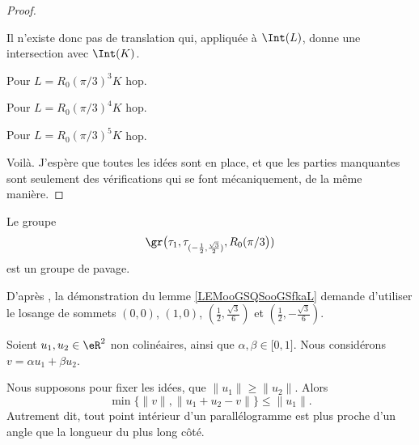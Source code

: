 \begin{proof}
\begin{subproof}
		Il n'existe donc pas de translation qui, appliquée à \( \Int(L)\), donne une intersection avec \( \Int(K)\).

		\item[Pour \( L=R_0(\pi/3)^3K\)]
		hop.
		\item[Pour \( L=R_0(\pi/3)^4K\)]
		hop.
		\item[Pour \( L=R_0(\pi/3)^5K\)]
		hop.
	\end{subproof}
	Voilà. J'espère que toutes les idées sont en place, et que les parties manquantes sont seulement des vérifications qui se font mécaniquement, de la même manière.
\end{proof}

\newcommand{\CaptionFigPWMCooGWYCczZn}{Illustrations pour le pavage du lemme \ref{LEMooMWWEooEbZXtb}.}


\begin{lemma}       \label{LEMooGSQSooGSfkaL}
	Le groupe
	\begin{equation}
		\gr\big(\tau_1,\tau_{(-\frac{ 1 }{2},\frac{ \sqrt{ 3 } }{2})},R_0(\pi/3\big))
	\end{equation}
	est un groupe de pavage.
\end{lemma}

D'après \cite{BIBooWIEGooJlwsCW}, la démonstration du lemme \ref{LEMooGSQSooGSfkaL} demande d'utiliser le losange de sommets \( (0,0)\), \( (1,0)\), \( (\frac{ 1 }{2},\frac{ \sqrt{ 3 } }{ 6 })\) et \( (\frac{ 1 }{2}, -\frac{  \sqrt{ 3 } }{ 6 })\).

\begin{lemma}        \label{LEMooEKWZooYbcGBp}
	Soient \( u_1,u_2\in \eR^2\) non colinéaires, ainsi que \( \alpha,\beta\in \mathopen[ 0 , 1 \mathclose]\). Nous considérons \( v=\alpha u_1+\beta u_2\).

	Nous supposons pour fixer les idées, que \( \| u_1 \|\geq \| u_2 \|\). Alors
	\begin{equation}
		\min\{ \| v \|, \| u_1+u_2-v \| \}\leq \| u_1 \|.
	\end{equation}
	Autrement dit, tout point intérieur d'un parallélogramme est plus proche d'un angle que la longueur du plus long côté.
\end{lemma}

